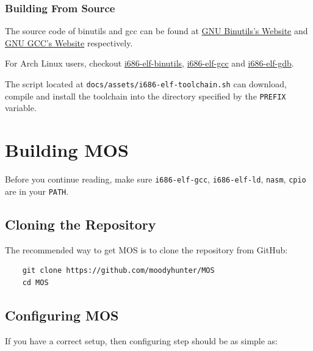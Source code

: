 \subsubsection{Building From Source}

The source code of binutils and gcc can be found at
\href{https://www.gnu.org/software/binutils}{GNU Binutils's Website} and
\href{https://gcc.gnu.org}{GNU GCC's Website} respectively.

\begin{note}
    \item For Arch Linux users, checkout
    \href{https://github.com/moodyhunter/repo/blob/main/moody/i686-elf-binutils/PKGBUILD}{i686-elf-binutils},
    \href{https://github.com/moodyhunter/repo/blob/main/moody/i686-elf-gcc/PKGBUILD}{i686-elf-gcc} and
    \href{https://github.com/moodyhunter/repo/blob/main/moody/i686-elf-gdb/PKGBUILD}{i686-elf-gdb}.
\end{note}

The script located at \texttt{docs/assets/i686-elf-toolchain.sh} can download, compile and
install the toolchain into the directory specified by the \texttt{PREFIX} variable.

\section{Building MOS}

\begin{note}
    \item Before you continue reading, make sure \texttt{i686-elf-gcc}, \texttt{i686-elf-ld},
    \texttt{nasm}, \texttt{cpio} are in your \texttt{PATH}.
\end{note}

\subsection{Cloning the Repository}

The recommended way to get MOS is to clone the repository from GitHub:

\begin{verbatim}
    git clone https://github.com/moodyhunter/MOS
    cd MOS
\end{verbatim}

\subsection{Configuring MOS}

If you have a correct setup, then configuring step should be as simple as:

